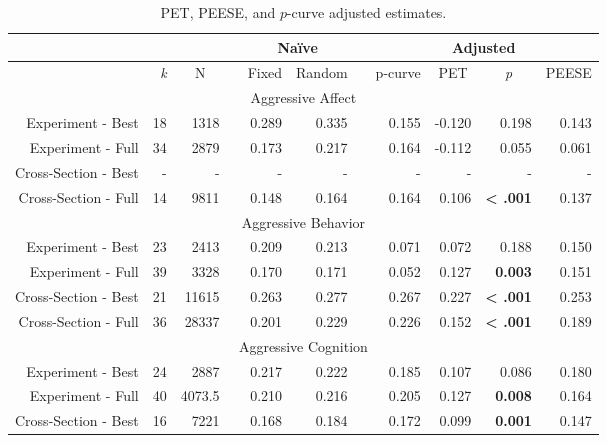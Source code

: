 \documentclass[man]{apa6}
\begin{document}
\begin{table}[htbp]
	\centering
	\caption{PET, PEESE, and $p$-curve adjusted estimates.}
	\begin{tabular}{rrrrrrrrrrr}
		\toprule
		&       &       &       & \multicolumn{2}{c}{Na{\"i}ve} & \multicolumn{1}{c}{} & \multicolumn{4}{c}{Adjusted} \\
		\midrule
		& \textit{k} & \multicolumn{1}{c}{N} & \multicolumn{1}{c}{} & \multicolumn{1}{c}{Fixed} & \multicolumn{1}{c}{Random} & \multicolumn{1}{c}{} & \multicolumn{1}{c}{p-curve} & \multicolumn{1}{c}{PET} & \multicolumn{1}{c}{\textit{p}} & \multicolumn{1}{c}{PEESE} \\
		\multicolumn{11}{c}{Aggressive Affect} \\
		Experiment - Best & 18    & 1318  &       & 0.289 & 0.335 &       & 0.155 & -0.120 & 0.198 & 0.143 \\
		Experiment - Full & 34    & 2879  &       & 0.173 & 0.217 &       & 0.164 & -0.112 & 0.055 & 0.061 \\
		Cross-Section - Best & -     & -     &       & -     & -     &       & -     & -     & -     & - \\
		Cross-Section - Full & 14    & 9811  &       & 0.148 & 0.164 &       & 0.164 & 0.106 & \textbf{< .001} & 0.137 \\
		\multicolumn{11}{c}{Aggressive Behavior} \\
		Experiment - Best & 23    & 2413  &       & 0.209 & 0.213 &       & 0.071 & 0.072 & 0.188 & 0.150 \\
		Experiment - Full & 39    & 3328  &       & 0.170 & 0.171 &       & 0.052 & 0.127 & \textbf{0.003} & 0.151 \\
		Cross-Section - Best & 21    & 11615 &       & 0.263 & 0.277 &       & 0.267 & 0.227 & \textbf{< .001} & 0.253 \\
		Cross-Section - Full & 36    & 28337 &       & 0.201 & 0.229 &       & 0.226 & 0.152 & \textbf{< .001} & 0.189 \\
		\multicolumn{11}{c}{Aggressive Cognition} \\
		Experiment - Best & 24    & 2887  &       & 0.217 & 0.222 &       & 0.185 & 0.107 & 0.086 & 0.180 \\
		Experiment - Full & 40    & 4073.5 &       & 0.210 & 0.216 &       & 0.205 & 0.127 & \textbf{0.008} & 0.164 \\
		Cross-Section - Best & 16    & 7221  &       & 0.168 & 0.184 &       & 0.172 & 0.099 & \textbf{0.001} & 0.147 \\

\end{tabular}
\end{table}
\end{document}
